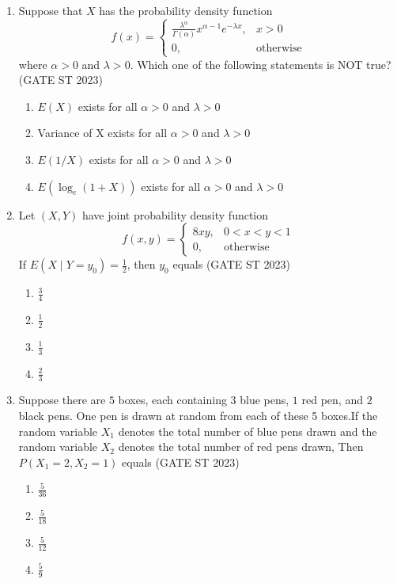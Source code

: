 \documentclass[journal]{IEEEtran}
\begin{document}
\begin{enumerate}[label=\textbf{Q.\arabic*.}, start=1, align=left, itemsep=2em]
\begin{enumerate}[label=\textbf{Q.\arabic*.}, start=11, align=left, itemsep=2em]
\item Suppose that $X$ has the probability density function
\[ f(x) = \begin{cases}
\frac{\lambda^\alpha}{\Gamma(\alpha)} x^{\alpha - 1} e^{-\lambda x}, & x>0 \\
0, & \text{otherwise}
\end{cases} \]
where $\alpha > 0$ and $\lambda > 0$. Which one of the following statements is NOT true? \hfill(GATE ST 2023) 
\begin{enumerate}[label=(\Alph*)]
    \item $E(X)$ exists for all $\alpha > 0$ and $\lambda > 0$
    \item Variance of X exists for all $\alpha > 0$ and $\lambda > 0$
    \item $E(1/X)$ exists for all $\alpha > 0$ and $\lambda > 0$
    \item $E(\log_e(1+X))$ exists for all $\alpha > 0$ and $\lambda > 0$
\end{enumerate}

\item Let $(X,Y)$ have joint probability density function
\[ f(x,y) = \begin{cases}
8xy, & 0 < x < y < 1 \\
0, & \text{otherwise}
\end{cases} \]
If $E(X \mid Y = y_0) = \frac12$, then $y_0$ equals \hfill(GATE ST 2023) 
\begin{enumerate}[label=(\Alph*)]
    \item $\frac{3}{4}$
    \item $\frac{1}{2}$
    \item $\frac{1}{3}$
    \item $\frac{2}{3}$
\end{enumerate}

\item Suppose there are $5$ boxes, each containing $3$ blue pens, $1$ red pen, and $2$ black pens. One pen is drawn at random from each of these 5 boxes.If the random variable $X_1$ denotes the total number of blue pens drawn and the random variable $X_2$ denotes the total  number of red pens drawn, Then $P(X_1 = 2, X_2 = 1)$ equals  \hfill(GATE ST 2023)
\begin{enumerate}[label=(\Alph*)]
    \item $\frac{5}{36}$
    \item $\frac{5}{18}$
    \item $\frac{5}{12}$
    \item $\frac{5}{9}$
\end{enumerate}


\end{enumerate}
\end{enumerate}
\end{document}
